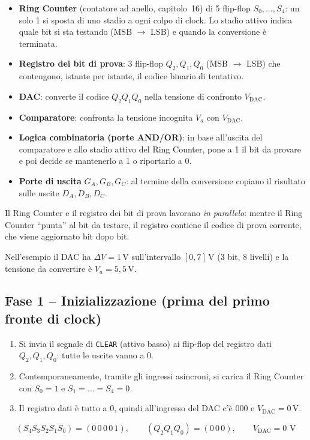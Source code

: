 \begin{itemize}[leftmargin=1.5em, itemsep=2pt]
    \item \textbf{Ring Counter} (contatore ad anello, capitolo~16) di 5 flip-flop
          $S_0,\dots,S_4$: un solo 1 si sposta di uno stadio a ogni colpo di clock. Lo stadio
          attivo indica quale bit si sta testando (MSB $\to$ LSB) e quando la conversione è
          terminata.
    \item \textbf{Registro dei bit di prova}: 3 flip-flop $Q_2, Q_1, Q_0$ (MSB $\to$ LSB)
          che contengono, istante per istante, il codice binario di tentativo.
    \item \textbf{DAC}: converte il codice $Q_2Q_1Q_0$ nella tensione di confronto
          $V_{\text{DAC}}$.
    \item \textbf{Comparatore}: confronta la tensione incognita $V_a$ con $V_{\text{DAC}}$.
    \item \textbf{Logica combinatoria (porte AND/OR)}: in base all'uscita del comparatore e
          allo stadio attivo del Ring Counter, pone a 1 il bit da provare e poi decide se
          mantenerlo a 1 o riportarlo a 0.
    \item \textbf{Porte di uscita} $G_A, G_B, G_C$: al termine della conversione copiano il
          risultato sulle uscite $D_A, D_B, D_C$.
\end{itemize}

\noindent Il Ring Counter e il registro dei bit di prova lavorano \emph{in parallelo}:
mentre il Ring Counter ``punta'' al bit da testare, il registro contiene il codice di prova
corrente, che viene aggiornato bit dopo bit.

\medskip
\noindent Nell'esempio il DAC ha $\Delta V = 1$\,V sull'intervallo $[0,7]$\,V (3 bit,
8 livelli) e la tensione da convertire è $V_a = 5{,}5$\,V.

\subsection*{Fase 1 -- Inizializzazione (prima del primo fronte di clock)}

\begin{enumerate}[leftmargin=1.8em, itemsep=2pt]
    \item Si invia il segnale di \texttt{CLEAR} (attivo basso) ai flip-flop del registro dati
          $Q_2,Q_1,Q_0$: tutte le uscite vanno a 0.
    \item Contemporaneamente, tramite gli ingressi asincroni, si carica il Ring Counter con
          $S_0=1$ e $S_1=\dots=S_4=0$.
    \item Il registro dati è tutto a 0, quindi all'ingresso del DAC c'è $000$ e
          $V_{\text{DAC}} = 0$\,V.
\end{enumerate}
\[
(S_4 S_3 S_2 S_1 S_0) = (0\,0\,0\,0\,1), \qquad (Q_2 Q_1 Q_0) = (0\,0\,0), \qquad V_{\text{DAC}}=0\text{ V}
\]

